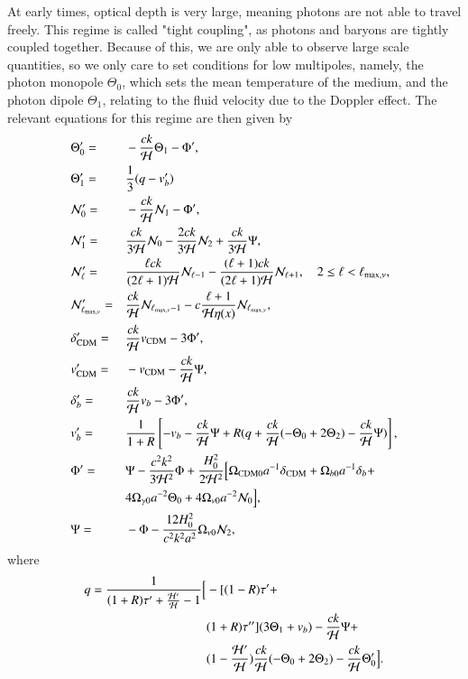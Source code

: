 \documentclass{aa}
\begin{document}
At early times, optical depth is very large, meaning photons are not able to travel freely. This regime is called "tight coupling", as photons and baryons are tightly coupled together. Because of this, we are only able to observe large scale quantities, so we only care to set conditions for low multipoles, namely, the photon monopole $\Theta_0$, which sets the mean temperature of the medium, and the photon dipole $\Theta_1$, relating to the fluid velocity due to the Doppler effect. The relevant equations for this regime are then given by
\begin{alignat*}{3}
&\Theta^\prime_0 =&& -\frac{ck}{\mathcal{H}} \Theta_1 - \Phi^\prime,\\
&\Theta^\prime_1 =&& \frac{1}{3} (q - v_b^\prime)\\
&\mathcal{N}^\prime_0 =&& -\frac{ck}{\mathcal{H}} \mathcal{N}_1 - \Phi^\prime, \\
&\mathcal{N}^\prime_1 =&&  \frac{ck}{3\mathcal{H}} \mathcal{N}_0 - \frac{2ck}{3\mathcal{H}}\mathcal{N}_2 + 
\frac{ck}{3\mathcal{H}}\Psi,\\
&\mathcal{N}^\prime_\ell =&& \frac{\ell ck}{(2\ell+1)\mathcal{H}} \mathcal{N}_{\ell-1} -
\frac{(\ell+1)ck}{(2\ell+1)\mathcal{H}}\mathcal{N}_{\ell+1},\quad 2 \le \ell <
\ell_{\textrm{max},\nu},\\
&\mathcal{N}_{\ell_{\textrm{max},\nu}}^\prime =&& \frac{ck}{\mathcal{H}}
\mathcal{N}_{\ell_{\textrm{max},\nu}-1}-c\frac{\ell+1}{\mathcal{H}\eta(x)}\mathcal{N}_{\ell_{\textrm{max},\nu}},\\
&\delta_{\rm CDM}^\prime =&& \frac{ck}{\mathcal{H}} v_{\rm CDM} - 3\Phi^\prime,\\
&v_{\rm CDM}^\prime =&& -v_{\rm CDM} -\frac{ck}{\mathcal{H}} \Psi,\\
&\delta_b^\prime =&& \frac{ck}{\mathcal{H}}v_b -3\Phi^\prime,\\
&v_b^\prime =&& \frac{1}{1+R} \left[-v_b - \frac{ck}{\mathcal{H}}\Psi + R(q +
\frac{ck}{\mathcal{H}}(-\Theta_0 + 2\Theta_2) - \frac{ck}{\mathcal{H}}\Psi)\right],\\
&\Phi^\prime =&& \Psi - \frac{c^2k^2}{3\mathcal{H}^2} \Phi + \frac{H_0^2}{2\mathcal{H}^2}\Bigl[\Omega_{\rm CDM 0} a^{-1} \delta_{\rm CDM} + \Omega_{b 0} a^{-1} \delta_b + \\& &&4\Omega_{\gamma 0}
a^{-2}\Theta_0 + 4\Omega_{\nu 0}a^{-2}\mathcal{N}_0\Bigr],\\
&\Psi =&& -\Phi - \frac{12H_0^2}{c^2k^2a^2}\Omega_{\nu 0}\mathcal{N}_2,
\end{alignat*}
where
\begin{align*}
    q = \frac{1}{{(1+R)\tau^\prime + \frac{\mathcal{H}^\prime}{\mathcal{H}} -
1}}\Bigl[&-[(1-R)\tau^\prime + \\&(1+R)\tau^{\prime\prime}](3\Theta_1+v_b) -
\frac{ck}{\mathcal{H}}\Psi +\\& (1-\frac{\mathcal{H}^\prime}{\mathcal{H}})\frac{ck}{\mathcal{H}}(-\Theta_0 +
2\Theta_2) - \frac{ck}{\mathcal{H}}\Theta_0^\prime\Bigr].
\end{align*}
\end{document}
